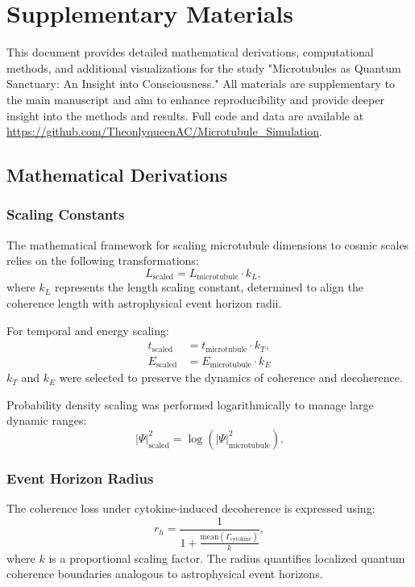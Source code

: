 \section*{Supplementary Materials}

This document provides detailed mathematical derivations, computational methods, and additional visualizations for the study "Microtubules as Quantum Sanctuary: An Insight into Consciousness." All materials are supplementary to the main manuscript and aim to enhance reproducibility and provide deeper insight into the methods and results. Full code and data are available at \url{https://github.com/TheonlyqueenAC/Microtubule_Simulation}.

\subsection{Mathematical Derivations}

\subsubsection{Scaling Constants}

The mathematical framework for scaling microtubule dimensions to cosmic scales relies on the following transformations:
\[
L_{\text{scaled}} = L_{\text{microtubule}} \cdot k_L, \quad
\]
where \(k_L\) represents the length scaling constant, determined to align the coherence length with astrophysical event horizon radii.

For temporal and energy scaling:
\[
\begin{aligned}
t_{\text{scaled}} &= t_{\text{microtubule}} \cdot k_T, \\
E_{\text{scaled}} &= E_{\text{microtubule}} \cdot k_E
\end{aligned}
\]
\(k_T\) and \(k_E\) were selected to preserve the dynamics of coherence and decoherence.

Probability density scaling was performed logarithmically to manage large dynamic ranges:
\[
|\Psi|^2_{\text{scaled}} = \log(|\Psi|^2_{\text{microtubule}}).
\]

\subsubsection{Event Horizon Radius}

The coherence loss under cytokine-induced decoherence is expressed using:
\[
r_h = \frac{1}{1 + \frac{\text{mean}(\Gamma_{\text{cytokine}})}{k}},
\]
where \(k\) is a proportional scaling factor. The radius quantifies localized quantum coherence boundaries analogous to astrophysical event horizons.

